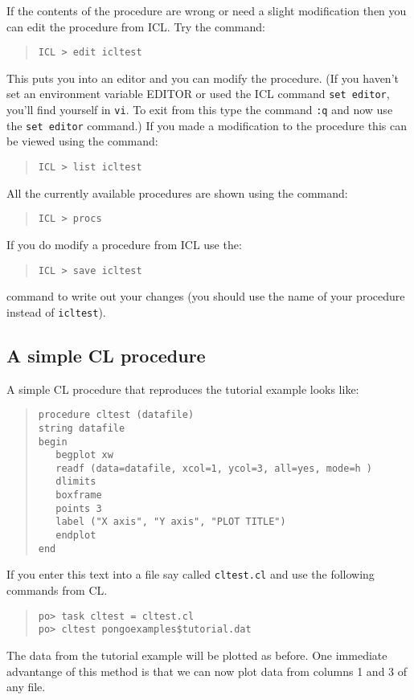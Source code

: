 If the contents of the procedure are wrong or need a slight
modification then you can edit the procedure from ICL. Try the command:
\begin{quote}
\begin{verbatim}
ICL > edit icltest
\end{verbatim}
\end{quote}
This puts you into an editor and you can modify the procedure. (If you
haven't set an environment variable EDITOR or used the ICL command
\verb+set editor+, you'll find yourself in \verb+vi+. To exit from this
type the command \verb+:q+ and now use the \verb+set editor+
command.) If you made a modification to the procedure this can be
viewed using the command:
\begin{quote}
\begin{verbatim}
ICL > list icltest
\end{verbatim}
\end{quote}
All the currently available procedures are shown using the command:
\begin{quote}
\begin{verbatim}
ICL > procs
\end{verbatim}
\end{quote}
If you do modify a procedure from ICL use the:
\begin{quote}
\begin{verbatim}
ICL > save icltest
\end{verbatim}
\end{quote}
command to write out your changes (you should use the name of your procedure
instead of \verb+icltest+).

\subsection{A simple CL procedure}

A simple CL procedure that reproduces the tutorial example looks like:
\begin{quote}
\begin{verbatim}
procedure cltest (datafile)
string datafile
begin
   begplot xw
   readf (data=datafile, xcol=1, ycol=3, all=yes, mode=h )
   dlimits
   boxframe
   points 3
   label ("X axis", "Y axis", "PLOT TITLE")
   endplot
end
\end{verbatim}
\end{quote}
If you enter this text into a file say called \verb+cltest.cl+ and use
the following commands from CL.
\begin{quote}
\begin{verbatim}
po> task cltest = cltest.cl
po> cltest pongoexamples$tutorial.dat
\end{verbatim}
\end{quote}
The data from the tutorial example will be plotted as before. One
immediate advantange of this method is that we can now plot data from
columns 1 and 3 of any file.

